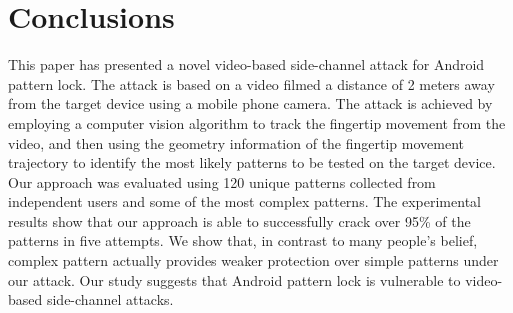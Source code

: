 \vspace{-2mm}
\section{Conclusions}
This paper has presented a novel video-based side-channel attack for
Android pattern lock. The attack is based on a video filmed a distance of 2 meters away from the target device using a mobile phone camera. The attack is
achieved by employing a computer vision algorithm to track the
fingertip movement from the video, and then using the geometry information
of the fingertip movement trajectory to identify the most likely patterns to be
tested on the target device.  Our approach was evaluated using 120 unique patterns collected
from independent users and some of the most complex patterns. The experimental results show that our approach
is able to successfully crack over 95\% of the patterns in five attempts.
We show that, in contrast to many people's belief, complex pattern actually provides
weaker protection over simple patterns under our attack. Our study
suggests that Android pattern lock is vulnerable to video-based
side-channel attacks.

